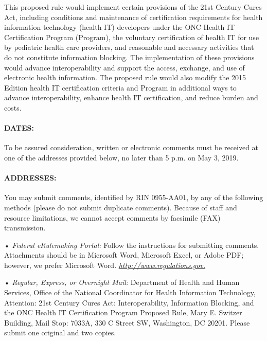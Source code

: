 \documentclass[twoside,11pt]{article}
\begin{document}
            This proposed rule would implement certain provisions of the 21st Century Cures Act, including conditions and maintenance of certification requirements for health information technology (health IT) developers under the ONC Health IT Certification Program (Program), the voluntary certification of health IT for use by pediatric health care providers, and reasonable and necessary activities that do not constitute information blocking. The implementation of these provisions would advance interoperability and support the access, exchange, and use of electronic health information. The proposed rule would also modify the 2015 Edition health IT certification criteria and Program in additional ways to advance interoperability, enhance health IT certification, and reduce burden and costs.


          
          
            \paragraph{DATES:}

            To be assured consideration, written or electronic comments must be received at one of the addresses provided below, no later than 5 p.m. on May 3, 2019.


          
          
            \paragraph{ADDRESSES:}

            You may submit comments, identified by RIN 0955-AA01, by any of the following methods (please do not submit duplicate comments). Because of staff and resource limitations, we cannot accept comments by facsimile (FAX) transmission.


            • \emph{Federal eRulemaking Portal:} Follow the instructions for submitting comments. Attachments should be in Microsoft Word, Microsoft Excel, or Adobe PDF; however, we prefer Microsoft Word. \emph{\url{http://www.regulations.gov.}}
            


            • \emph{Regular, Express, or Overnight Mail:} Department of Health and Human Services, Office of the National Coordinator for Health Information Technology, Attention: 21st Century Cures Act: Interoperability, Information Blocking, and the ONC Health IT Certification Program Proposed Rule, Mary E. Switzer Building, Mail Stop: 7033A, 330 C Street SW, Washington, DC 20201. Please submit one original and two copies.
\end{document}
